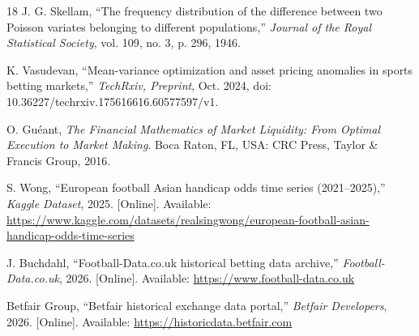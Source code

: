 \documentclass[10pt,twocolumn]{article}
\begin{document}
\begin{thebibliography}{18}
 J. G. Skellam, ``The frequency distribution of the difference between two Poisson variates belonging to different populations,'' \textit{Journal of the Royal Statistical Society}, vol. 109, no. 3, p. 296, 1946.

 K. Vasudevan, ``Mean-variance optimization and asset pricing anomalies in sports betting markets,'' \textit{TechRxiv, Preprint}, Oct. 2024, doi: 10.36227/techrxiv.175616616.60577597/v1.

 O. Gu{\'e}ant, \textit{The Financial Mathematics of Market Liquidity: From Optimal Execution to Market Making}. Boca Raton, FL, USA: CRC Press, Taylor \& Francis Group, 2016.

 S. Wong, ``European football Asian handicap odds time series (2021--2025),'' \textit{Kaggle Dataset}, 2025. [Online]. Available: \url{https://www.kaggle.com/datasets/realsingwong/european-football-asian-handicap-odds-time-series}

 J. Buchdahl, ``Football-Data.co.uk historical betting data archive,'' \textit{Football-Data.co.uk}, 2026. [Online]. Available: \url{https://www.football-data.co.uk}

 Betfair Group, ``Betfair historical exchange data portal,'' \textit{Betfair Developers}, 2026. [Online]. Available: \url{https://historicdata.betfair.com}

\end{thebibliography}
\end{document}
